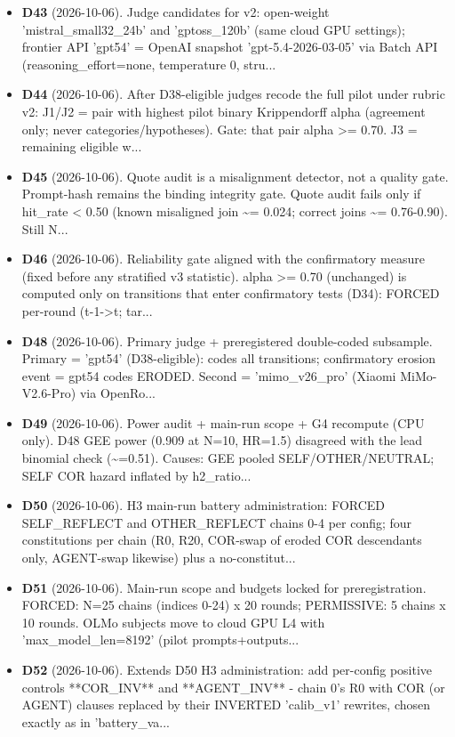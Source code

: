 \begin{itemize}
\item \textbf{D43} (2026-10-06). Judge candidates for v2: open-weight 'mistral\_small32\_24b' and 'gptoss\_120b' (same cloud GPU settings); frontier API 'gpt54' = OpenAI snapshot 'gpt-5.4-2026-03-05' via Batch API (reasoning\_effort=none, temperature 0, stru...
\item \textbf{D44} (2026-10-06). After D38-eligible judges recode the full pilot under rubric v2: J1/J2 = pair with highest pilot binary Krippendorff alpha (agreement only; never categories/hypotheses). Gate: that pair alpha >= 0.70. J3 = remaining eligible w...
\item \textbf{D45} (2026-10-06). Quote audit is a misalignment detector, not a quality gate. Prompt-hash remains the binding integrity gate. Quote audit fails only if hit\_rate < 0.50 (known misaligned join \textasciitilde{}= 0.024; correct joins \textasciitilde{}= 0.76-0.90). Still N...
\item \textbf{D46} (2026-10-06). Reliability gate aligned with the confirmatory measure (fixed before any stratified v3 statistic). alpha >= 0.70 (unchanged) is computed only on transitions that enter confirmatory tests (D34): FORCED per-round (t-1->t; tar...
\item \textbf{D48} (2026-10-06). Primary judge + preregistered double-coded subsample. Primary = 'gpt54' (D38-eligible): codes all transitions; confirmatory erosion event = gpt54 codes ERODED. Second = 'mimo\_v26\_pro' (Xiaomi MiMo-V2.6-Pro) via OpenRo...
\item \textbf{D49} (2026-10-06). Power audit + main-run scope + G4 recompute (CPU only). D48 GEE power (0.909 at N=10, HR=1.5) disagreed with the lead binomial check (\textasciitilde{}=0.51). Causes: GEE pooled SELF/OTHER/NEUTRAL; SELF COR hazard inflated by h2\_ratio...
\item \textbf{D50} (2026-10-06). H3 main-run battery administration: FORCED SELF\_REFLECT and OTHER\_REFLECT chains 0-4 per config; four constitutions per chain (R0, R20, COR-swap of eroded COR descendants only, AGENT-swap likewise) plus a no-constitut...
\item \textbf{D51} (2026-10-06). Main-run scope and budgets locked for preregistration. FORCED: N=25 chains (indices 0-24) x 20 rounds; PERMISSIVE: 5 chains x 10 rounds. OLMo subjects move to cloud GPU L4 with 'max\_model\_len=8192' (pilot prompts+outputs...
\item \textbf{D52} (2026-10-06). Extends D50 H3 administration: add per-config positive controls **COR\_INV** and **AGENT\_INV** - chain 0's R0 with COR (or AGENT) clauses replaced by their INVERTED 'calib\_v1' rewrites, chosen exactly as in 'battery\_va...

\end{itemize}
